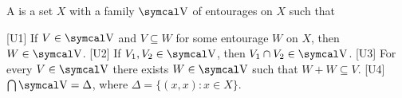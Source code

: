 \begin{definition}\label{def:uniform_space}\cite[section 8.1]{Engelking1989}
  A  is a set \( X \) with a family \( \CV \) of entourages on \( X \) such that
  \begin{defenum}
    [U1] If \( V \in \CV \) and \( V \subseteq W \) for some entourage \( W \) on \( X \), then \( W \in \CV \).
    [U2] If \( V_1, V_2 \in \CV \), then \( V_1 \cap V_2 \in \CV \).
    [U3] For every \( V \in \CV \) there exists \( W \in \CV \) such that \( W + W \subseteq V \).
    [U4] \( \bigcap \CV = \Delta \), where \( \Delta = \{ (x, x) \colon x \in X \} \).
  \end{defenum}
\end{definition}

